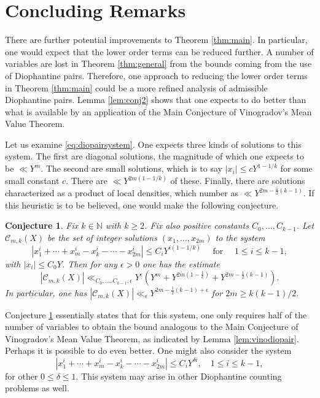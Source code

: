 \documentclass[11pt,reqno]{amsart}
\newtheorem{conjecture}{Conjecture}[section]
\numberwithin{equation}{section}
\begin{document}
\section{Concluding Remarks} \label{sec:conc}
There are further potential improvements to Theorem \ref{thm:main}. In particular, one would expect that the lower order terms can be reduced further. A number of variables are lost in Theorem \ref{thm:general} from the bounds coming from the use of Diophantine pairs. Therefore, one approach to reducing the lower order terms in Theorem \ref{thm:main} could be a more refined analysis of admissible Diophantine pairs. Lemma \ref{lem:conj2} shows that one expects to do better than what is available by an application of the Main Conjecture of Vinogradov's Mean Value Theorem. 

Let us examine \eqref{eq:diopairsystem}. One expects three kinds of solutions to this system. The first are diagonal solutions, the magnitude of which one expects to be $\ll Y^m$. The second are small solutions, which is to say $|x_i| \leq cY^{1-1/k}$ for some small constant $c$. There are $\ll Y^{2m(1-1/k)}$ of these. Finally, there are solutions characterized as a product of local densities, which number as $\ll Y^{2m-\frac{1}{2}(k-1)}$. If this heuristic is to be believed, one would make the following conjecture. 

\begin{conjecture} \label{conj:dioph}
Fix $k \in \mathbb{N}$ with $k \geq 2$. Fix also positive constants $C_0, \ldots, C_{k-1}$. Let $\mathcal{C}_{m,k}(X)$ be the set of integer solutions $(x_1,\ldots,x_{2m})$ to the system 
\[ |x_1^i +\cdots+x_{m}^i-x_{k}^i-\cdots-x_{2m}^i| \leq C_i Y^{i(1-1/k)} \quad \text{ for } \quad 1 \leq i \leq k-1, \]
with $|x_i| \leq C_0Y$. 
Then for any $\epsilon > 0$ one has the estimate 
\[ |\mathcal{C}_{m,k}(X)| \ll_{C_0,\ldots,C_{k-1}, \epsilon} Y^{\epsilon}( Y^{m}+Y^{2m(1-\frac{1}{k})}+ Y^{2m-\frac{1}{2}(k-1)}). \] 
In particular, one has $|\mathcal{C}_{m,k}(X)| \ll_{\epsilon} Y^{2m-\frac{1}{2}(k-1)+\epsilon}$ for $2m \geq k(k-1)/2$. 
\end{conjecture} 

Conjecture \ref{conj:dioph} essentially states that for this system, one only requires half of the number of variables to obtain the bound analogous to the Main Conjecture of Vinogradov's Mean Value Theorem, as indicated by Lemma \ref{lem:vinodiopair}. Perhaps it is possible to do even better. One might also consider the system 
\[ |x_1^i +\cdots+x_{m}^i-x_{k}^i-\cdots-x_{2m}^i| \leq C_i Y^{\delta i}, \quad 1 \leq i \leq k-1, \]
for other $0 \leq \delta \leq 1$. This system may arise in other Diophantine counting problems as well. 
\end{document}
